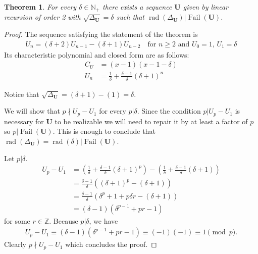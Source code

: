 \documentclass[preprint,12pt]{elsarticle}
\newcommand{\N}{\mathbb{N}}
\newcommand{\Z}{\mathbb{Z}}
\DeclareMathOperator{\rad}{rad}
\DeclareMathOperator{\fail}{Fail}
\newtheorem{theorem}{Theorem}
\begin{document}
\begin{theorem}
    For every $\delta\in\N_+$ there exists a sequence ${\mathbf U}$ given by linear recursion of order 2 with $\sqrt{\Delta_{\mathbf U}} = \delta$ such that  $\rad(\Delta_{\mathbf U})| \fail({\mathbf U})$.
\end{theorem}
\begin{proof}
    The sequence satisfying the statement of the theorem is
    \begin{align}
        U_n = (\delta+2)U_{n-1} - (\delta+1)U_{n-2} \quad\text{for $n\geqslant 2$ \ and\ \ $U_0=1$, $U_1=\delta$} \label{dd}
    \end{align}
    Its characteristic polynomial and closed form are as follows:
    \begin{align}
        C_U &= (x-1)(x-1-\delta)\\
        U_n &= \frac{1}{\delta} + \frac{\delta-1}{\delta}(\delta+1)^n
    \end{align}

    Notice that $\sqrt{\Delta_{\mathbf U}} = (\delta+1) - (1) = \delta$. 
    
    We will show that $p\nmid U_p-U_1$ for every $p|\delta$. Since the condition $p|U_p-U_1$ is necessary for ${\mathbf U}$ to be realizable we will need to repair it by at least a factor of $p$ so $p|\fail({\mathbf U})$. This is enough to conclude that $\rad(\Delta_{\mathbf U}) = \rad(\delta)|\fail({\mathbf U})$.
    
    Let $p|\delta$.
    \begin{align}
        U_p - U_1 &=  
        \left( \frac{1}{\delta} + \frac{\delta-1}{\delta}(\delta+1)^p \right) - \left( \frac{1}{\delta} + \frac{\delta-1}{\delta}(\delta+1) \right) \\ 
        &=  \frac{\delta-1}{\delta} \left( (\delta+1)^p - (\delta+1) \right) \\
        &=  \frac{\delta-1}{\delta} \left( \delta^p+1 + p\delta r - (\delta+1) \right) \\
        &=  (\delta-1) \left( \delta^{p-1} + p r - 1 \right)
    \end{align}
    for some $r\in \Z$. Because $p|\delta$, we have
    \begin{align}
        U_p - U_1 \equiv 
         (\delta-1) \left( \delta^{p-1} + p r - 1 \right) 
         \equiv (-1) (-1) \equiv 1 \pmod{p}.
    \end{align}
    Clearly $p\nmid U_p - U_1$ which concludes the proof.

\end{proof}
\end{document}
